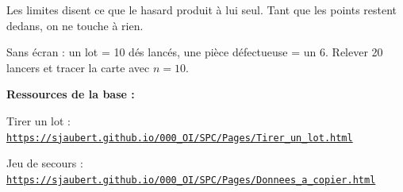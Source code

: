 \documentclass[10pt,a4paper]{article}
\begin{document}
\begin{tcolorbox}[retenir]Les limites disent ce que le hasard produit à lui seul. Tant que les points restent dedans, on ne touche à rien.\end{tcolorbox}
\begin{tcolorbox}[plus]Sans écran : un lot = 10 dés lancés, une pièce défectueuse = un 6. Relever 20 lancers et tracer la carte avec $n = 10$.\end{tcolorbox}
\vfill{\footnotesize\color{uimm}\textbf{Ressources de la base :}\par Tirer un lot : \href{https://sjaubert.github.io/000_OI/SPC/Pages/Tirer_un_lot.html}{\nolinkurl{https://sjaubert.github.io/000_OI/SPC/Pages/Tirer_un_lot.html}}\par Jeu de secours : \href{https://sjaubert.github.io/000_OI/SPC/Pages/Donnees_a_copier.html\#lots35}{\nolinkurl{https://sjaubert.github.io/000_OI/SPC/Pages/Donnees_a_copier.html}}}
\end{document}
